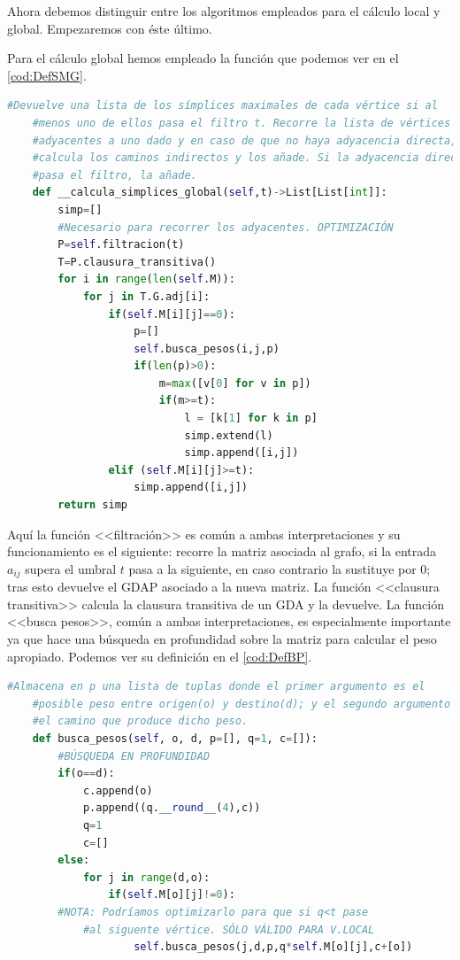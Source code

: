 \documentclass[12pt, a4paper, twoside]{book}
\numberwithin{equation}{section}
\theoremstyle{definition}
\theoremstyle{remark}
\theoremstyle{plain}
\begin{document}
	Ahora debemos distinguir entre los algoritmos empleados para el 
	cálculo local y global. Empezaremos con éste último.

	Para el cálculo global hemos empleado la función que podemos ver en 
	el \autoref{cod:DefSMG}.

	\begin{lstlisting}[language=Python,float=htbp,caption=Función para el 
	cálculo de símplices maximales (global)., label=cod:DefSMG]
	#Devuelve una lista de los símplices maximales de cada vértice si al 
	#menos uno de ellos pasa el filtro t. Recorre la lista de vértices 
	#adyacentes a uno dado y en caso de que no haya adyacencia directa, 
	#calcula los caminos indirectos y los añade. Si la adyacencia directa 
	#pasa el filtro, la añade.
	def __calcula_simplices_global(self,t)->List[List[int]]:
        simp=[]
        #Necesario para recorrer los adyacentes. OPTIMIZACIÓN
        P=self.filtracion(t)
        T=P.clausura_transitiva()
        for i in range(len(self.M)):
            for j in T.G.adj[i]:
                if(self.M[i][j]==0):
                    p=[]
                    self.busca_pesos(i,j,p)
                    if(len(p)>0):
                        m=max([v[0] for v in p])
                        if(m>=t):
                            l = [k[1] for k in p]
                            simp.extend(l)
                            simp.append([i,j])
                elif (self.M[i][j]>=t):
                    simp.append([i,j])
        return simp
	\end{lstlisting}

	Aquí la función <<filtración>> es común a ambas 
	interpretaciones y su funcionamiento es el siguiente: recorre la 
	matriz asociada al grafo, si la entrada $a_{ij}$ supera el umbral $t$ 
	pasa a la siguiente, en caso contrario la sustituye por 0; tras esto 
	devuelve el GDAP asociado a la nueva matriz. La función 
	<<clausura transitiva>> calcula la clausura transitiva de un GDA y 
	la devuelve. La función <<busca pesos>>, común a ambas 
	interpretaciones, es especialmente importante ya 
	que hace una búsqueda en profundidad sobre la matriz para calcular el
	peso apropiado. Podemos ver su definición en el \autoref{cod:DefBP}.

	\begin{lstlisting}[language=Python, float=htbp, caption= Función de 
	búsqueda de pesos., label=cod:DefBP]
	#Almacena en p una lista de tuplas donde el primer argumento es el 
	#posible peso entre origen(o) y destino(d); y el segundo argumento es 
	#el camino que produce dicho peso. 
	def busca_pesos(self, o, d, p=[], q=1, c=[]):
        #BÚSQUEDA EN PROFUNDIDAD
        if(o==d):
            c.append(o)
            p.append((q.__round__(4),c))
            q=1
            c=[]
        else:   
            for j in range(d,o):
                if(self.M[o][j]!=0):
        #NOTA: Podríamos optimizarlo para que si q<t pase 
		    #al siguente vértice. SÓLO VÁLIDO PARA V.LOCAL
                    self.busca_pesos(j,d,p,q*self.M[o][j],c+[o])
	\end{lstlisting}
\end{document}
